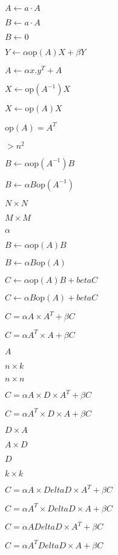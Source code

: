 \documentclass{article}
\begin{document}
$A \gets a \cdot A$
\pagebreak

$B \gets a \cdot A$
\pagebreak

$ B \gets 0$
\pagebreak

$Y \gets \alpha \mathrm{op}(A) X + \beta Y $
\pagebreak

$A \gets \alpha x . y^T + A$
\pagebreak

$ X \gets \mathrm{op}(A^{-1}) X$
\pagebreak

$ X \gets \mathrm{op}(A) X$
\pagebreak

$\mathrm{op}(A)=A^T$
\pagebreak

$>n^2$
\pagebreak

$ B \gets \alpha \mathrm{op}(A^{-1}) B$
\pagebreak

$B \gets \alpha B \mathrm{op}(A^{-1})$
\pagebreak

$N\times N$
\pagebreak

$M\times M$
\pagebreak

$\alpha$
\pagebreak

$ B \gets \alpha \mathrm{op}(A) B$
\pagebreak

$B \gets \alpha B \mathrm{op}(A)$
\pagebreak

$ C \gets \alpha \mathrm{op}(A) B + beta C$
\pagebreak

$C \gets \alpha B \mathrm{op}(A) + beta C$
\pagebreak

$C = \alpha A \times A^T + \beta C$
\pagebreak

$C = \alpha A^T \times A + \beta C$
\pagebreak

$A$
\pagebreak

$n \times k$
\pagebreak

$n \times n$
\pagebreak

$C = \alpha A \times D \times A^T + \beta C$
\pagebreak

$C = \alpha A^T \times D \times A + \beta C$
\pagebreak

$ D\times A$
\pagebreak

$ A\times D$
\pagebreak

$D$
\pagebreak

$k \times k$
\pagebreak

$C = \alpha A \times Delta D \times A^T + \beta C$
\pagebreak

$C = \alpha A^T \times Delta D \times A + \beta C$
\pagebreak

$C = \alpha A Delta D \times A^T + \beta C$
\pagebreak

$C = \alpha A^T Delta D \times A + \beta C$
\pagebreak
\end{document}
